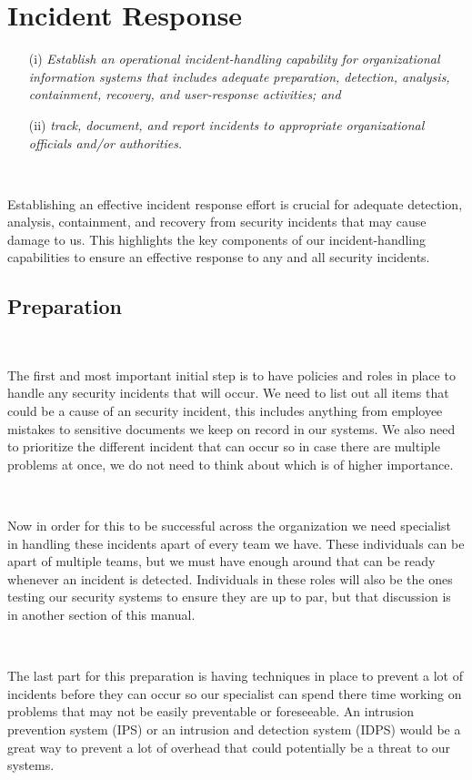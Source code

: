 \documentclass[12pt,a4paper]{report}
\begin{document}
\chapter{Incident Response}
\begin{enumerate}
 \item[(i)]	\textit{Establish an operational incident-handling capability for organizational information systems that includes adequate preparation, detection, analysis, containment, recovery, and user-response activities; and}
 \item[(ii)] \textit{track, document, and report incidents to appropriate organizational officials and/or authorities.}
\end{enumerate}

\

Establishing an effective incident response effort is crucial for adequate detection, analysis, containment, and recovery from security incidents that may cause damage to us.
This highlights the key components of our incident-handling capabilities to ensure an effective response to any and all security incidents.

\section{Preparation}
\

The first and most important initial step is to have policies and roles in place to handle any security incidents that will occur.
We need to list out all items that could be a cause of an security incident, this includes anything from employee mistakes to sensitive documents we keep on record in our systems.
We also need to prioritize the different incident that can occur so in case there are multiple problems at once, we do not need to think about which is of higher importance.

\

Now in order for this to be successful across the organization we need specialist in handling these incidents apart of every team we have.
These individuals can be apart of multiple teams, but we must have enough around that can be ready whenever an incident is detected.
Individuals in these roles will also be the ones testing our security systems to ensure they are up to par, but that discussion is in another section of this manual.

\

The last part for this preparation is having techniques in place to prevent a lot of incidents before they can occur so our specialist can spend there time working on problems that may not be easily preventable or foreseeable.
An intrusion prevention system (IPS) or an intrusion and detection system (IDPS) would be a great way to prevent a lot of overhead that could potentially be a threat to our systems.
\end{document}
